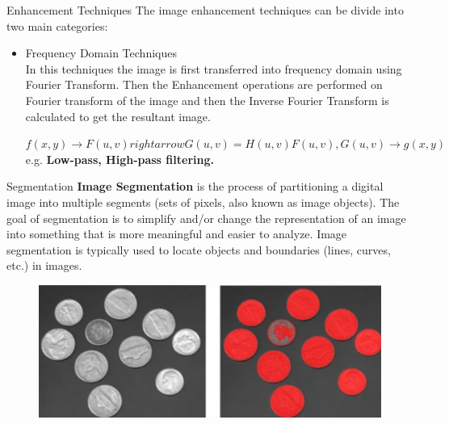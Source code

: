 \documentclass[12pt]{beamer}
\begin{document}
\begin{frame}{Enhancement Techniques}
\large The image enhancement techniques can be divide into two main categories:
\normalsize
{}
 {
\begin{itemize}
\item<2> Frequency Domain Techniques \\
In this techniques the image is first transferred into frequency domain using Fourier Transform. Then the Enhancement operations are performed on Fourier transform of the image and then the Inverse Fourier Transform is calculated to get the resultant image.

$f(x,y) \rightarrow F(u,v) rightarrow G(u,v) = H(u,v)F(u,v), G(u,v) \rightarrow g(x,y) $ \\
e.g. \textbf{Low-pass, High-pass filtering.}
\end{itemize}
}
\end{frame}
\begin{frame}{Segmentation}
\textbf{Image Segmentation}
 is the process of partitioning a digital image into multiple segments (sets of pixels, also known as image objects). The goal of segmentation is to simplify and/or change the representation of an image into something that is more meaningful and easier to analyze. Image segmentation is typically used to locate objects and boundaries (lines, curves, etc.) in images. 
 \begin{figure}[H]
 \begin{center}
 \includegraphics[scale=0.2]{coins.png}
 \end{center}
 \end{figure}
\end{frame}
\end{document}
